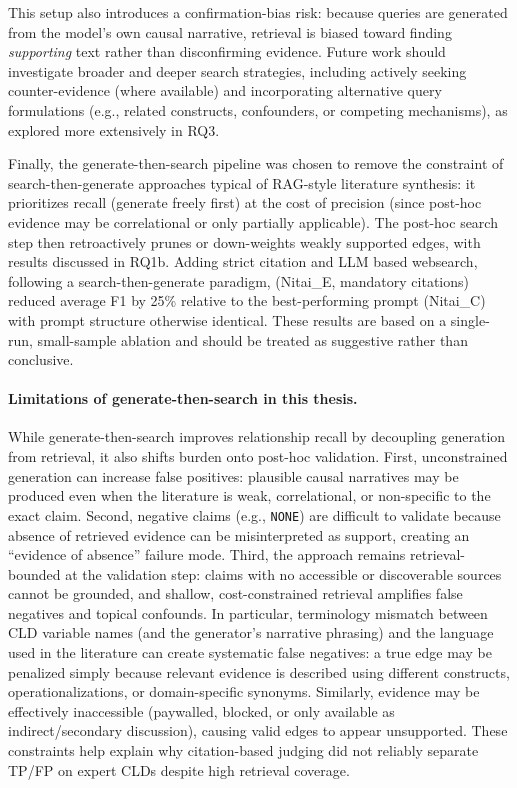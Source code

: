 This setup also introduces a confirmation-bias risk: because queries are generated from the model's own causal narrative, retrieval is biased toward finding \textit{supporting} text rather than disconfirming evidence. Future work should investigate broader and deeper search strategies, including actively seeking counter-evidence (where available) and incorporating alternative query formulations (e.g., related constructs, confounders, or competing mechanisms), as explored more extensively in RQ3.

Finally, the generate-then-search pipeline was chosen to remove the constraint of search-then-generate approaches typical of RAG-style literature synthesis: it prioritizes recall (generate freely first) at the cost of precision (since post-hoc evidence may be correlational or only partially applicable). The post-hoc search step then retroactively prunes or down-weights weakly supported edges, with results discussed in RQ1b.
Adding strict citation and LLM based websearch, following a search-then-generate paradigm, (Nitai\_E, mandatory citations) reduced average F1 by 25\% relative to the best-performing prompt (Nitai\_C) with prompt structure otherwise identical. These results are based on a single-run, small-sample ablation and should be treated as suggestive rather than conclusive.

\paragraph{Limitations of generate-then-search in this thesis.}
While generate-then-search improves relationship recall by decoupling generation from retrieval, it also shifts burden onto post-hoc validation. First, unconstrained generation can increase false positives: plausible causal narratives may be produced even when the literature is weak, correlational, or non-specific to the exact claim. Second, negative claims (e.g., \texttt{NONE}) are difficult to validate because absence of retrieved evidence can be misinterpreted as support, creating an ``evidence of absence'' failure mode. Third, the approach remains retrieval-bounded at the validation step: claims with no accessible or discoverable sources cannot be grounded, and shallow, cost-constrained retrieval amplifies false negatives and topical confounds. In particular, terminology mismatch between CLD variable names (and the generator's narrative phrasing) and the language used in the literature can create systematic false negatives: a true edge may be penalized simply because relevant evidence is described using different constructs, operationalizations, or domain-specific synonyms. Similarly, evidence may be effectively inaccessible (paywalled, blocked, or only available as indirect/secondary discussion), causing valid edges to appear unsupported. These constraints help explain why citation-based judging did not reliably separate TP/FP on expert CLDs despite high retrieval coverage.

